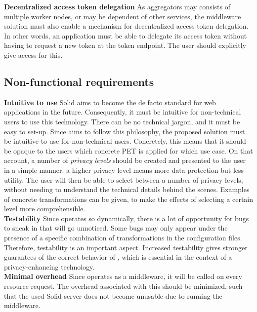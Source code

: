 \noindent \textbf{Decentralized access token delegation} As aggregators may consists of multiple worker nodes, or may be dependent of other services, the middleware solution must also enable a mechanism for decentralized access token delegation. In other words, an application must be able to delegate its access token without having to request a new token at the token endpoint. The user should explicitly give access for this.

\subsection{Non-functional requirements}
\textbf{Intuitive to use} Solid aims to become the de facto standard for web applications in the future. Consequently, it must be intuitive for non-technical users to use this technology. There can be no technical jargon, and it must be easy to set-up. Since \middleware{} aims to follow this philosophy, the proposed solution must be intuitive to use for non-technical users.  Concretely, this means that it should be opaque to the users which concrete PET is applied for which use case. On that account, a number of \textit{privacy levels} should be created and presented to the user in a simple manner: a higher privacy level means more data protection but less utility. The user will then be able to select between a number of privacy levels, without needing to understand the technical details behind the scenes. Examples of concrete transformations can be given, to make the effects of selecting a certain level more comprehensible. \\

\noindent \textbf{Testability} Since \middleware{} operates so dynamically, there is a lot of opportunity for bugs to sneak in that will go unnoticed. Some bugs may only appear under the presence of a specific combination of transformations in the configuration files. Therefore, testability is an important aspect. Increased testability gives stronger guarantees of the correct behavior of \middleware{}, which is essential in the context of a privacy-enhancing technology. \\

\noindent \textbf{Minimal overhead} Since \middleware{} operates as a middleware, it will be called on every resource request. The overhead associated with this should be minimized, such that the used Solid server does not become unusable due to running the middleware.

